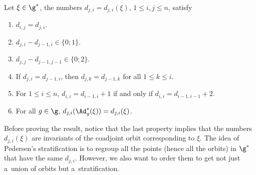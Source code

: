 \begin{prop}
 Let $\xi \in \g^*$, the numbers $d_{j,i} = d_{j,i}(\xi)$, $1\leq i,j\leq n$, satisfy
 \begin{enumerate}\itemsep=0pt
 \item[$(1)$] $d_{i,j} = d_{j,i}$.
 \item[$(2)$] $d_{j,i} - d_{j-1,i} \in \{0;1\}$.
 \item[$(3)$] $d_{j,j} - d_{j-1,j-1} \in \{0;2\}$.
 \item[$(4)$] If $d_{j,i} = d_{j-1,i}$, then $d_{j,k} = d_{j-1,k}$ for all $1\leq k \leq i$.
 \item[$(5)$] For $1\leq i \leq n$, $d_{i,i} = d_{i-1,i}+1$ if and only if $d_{i,i} = d_{i-1,i-1}+2$.
 \item[$(6)$] For all $g \in \g$, $d_{j,i}(\Ad^*_g(\xi)) = d_{j,i}(\xi)$.
 \end{enumerate}
\end{prop}

Before proving the result, notice that the last property implies that the numbers $d_{j,i}(\xi)$ are invariants of the coadjoint orbit corresponding to $\xi$. The idea of Pedersen's stratification is to regroup all the points (hence all the orbits) in $\g^*$ that have the same $d_{j,i}$. However, we also want to order them to get not just a~union of orbits but a~stratification.

